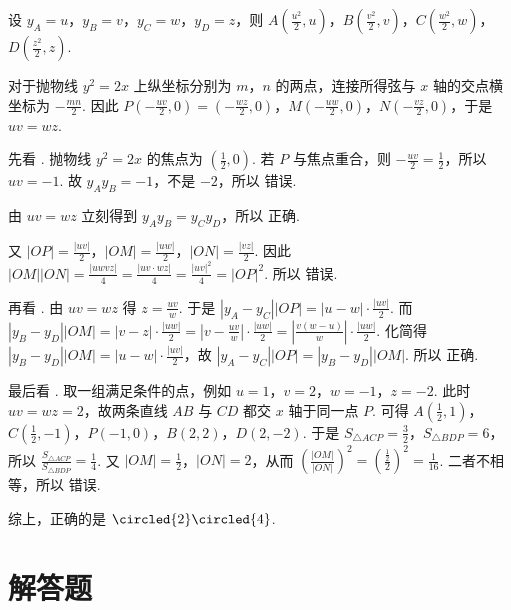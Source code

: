 \documentclass[UTF8,a4paper,oneside,11pt]{ctexbook}
\begin{document}
\begin{solution}
设 \(y_A=u\)，\(y_B=v\)，\(y_C=w\)，\(y_D=z\)，则 \(A\left( \frac{u^2}{2},u \right)\)，\(B\left( \frac{v^2}{2},v \right)\)，\(C\left( \frac{w^2}{2},w \right)\)，\(D\left( \frac{z^2}{2},z \right)\).

对于抛物线 \(y^2=2x\) 上纵坐标分别为 \(m\)，\(n\) 的两点，连接所得弦与 \(x\) 轴的交点横坐标为 \(-\frac{mn}{2}\). 因此 \(P\left( -\frac{uv}{2},0 \right)=\left( -\frac{wz}{2},0 \right)\)，\(M\left( -\frac{uw}{2},0 \right)\)，\(N\left( -\frac{vz}{2},0 \right)\)，于是 \(uv=wz\).

先看 . 抛物线 \(y^2=2x\) 的焦点为 \(\left( \frac{1}{2},0 \right)\). 若 \(P\) 与焦点重合，则 \(-\frac{uv}{2}=\frac{1}{2}\)，所以 \(uv=-1\). 故 \(y_Ay_B=-1\)，不是 \(-2\)，所以  错误.

由 \(uv=wz\) 立刻得到 \(y_Ay_B=y_Cy_D\)，所以  正确.

又 \(|OP|=\frac{|uv|}{2}\)，\(|OM|=\frac{|uw|}{2}\)，\(|ON|=\frac{|vz|}{2}\). 因此 \(|OM||ON|=\frac{|uwvz|}{4}=\frac{|uv\cdot wz|}{4}=\frac{|uv|^2}{4}=|OP|^2\). 所以  错误.

再看 . 由 \(uv=wz\) 得 \(z=\frac{uv}{w}\). 于是 \(\left| y_A-y_C \right||OP|=\left| u-w \right|\cdot \frac{|uv|}{2}\). 而 \(\left| y_B-y_D \right||OM|=\left| v-z \right|\cdot \frac{|uw|}{2}=\left| v-\frac{uv}{w} \right|\cdot \frac{|uw|}{2}=\left| \frac{v\left( w-u \right)}{w} \right|\cdot \frac{|uw|}{2}\). 化简得 \(\left| y_B-y_D \right||OM|=\left| u-w \right|\cdot \frac{|uv|}{2}\)，故 \(\left| y_A-y_C \right||OP|=\left| y_B-y_D \right||OM|\). 所以  正确.

最后看 . 取一组满足条件的点，例如 \(u=1\)，\(v=2\)，\(w=-1\)，\(z=-2\). 此时 \(uv=wz=2\)，故两条直线 \(AB\) 与 \(CD\) 都交 \(x\) 轴于同一点 \(P\). 可得 \(A\left( \frac{1}{2},1 \right)\)，\(C\left( \frac{1}{2},-1 \right)\)，\(P(-1,0)\)，\(B(2,2)\)，\(D(2,-2)\). 于是 \(S_{\triangle ACP}=\frac{3}{2}\)，\(S_{\triangle BDP}=6\)，所以 \(\frac{S_{\triangle ACP}}{S_{\triangle BDP}}=\frac{1}{4}\). 又 \(|OM|=\frac{1}{2}\)，\(|ON|=2\)，从而 \(\left( \frac{|OM|}{|ON|} \right)^2=\left( \frac{\frac{1}{2}}{2} \right)^2=\frac{1}{16}\). 二者不相等，所以  错误.

综上，正确的是 \(\circled{2}\circled{4}\).
\end{solution}
\section{解答题}
\end{document}
